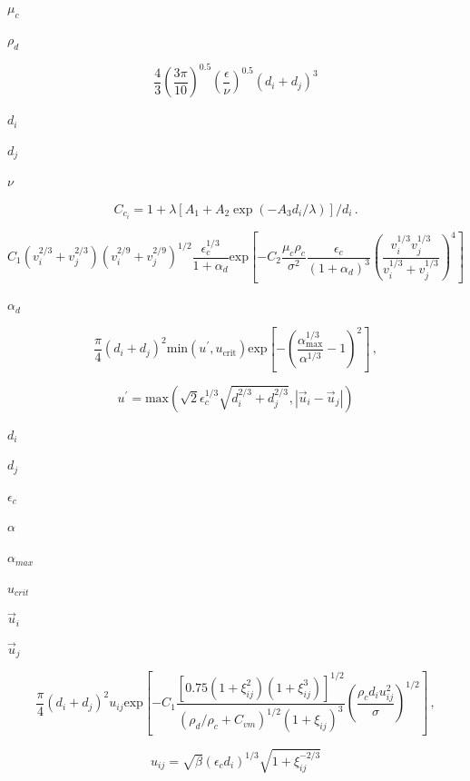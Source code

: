 \documentclass{article}
\begin{document}
$        \mu_c       $
\pagebreak

$        \rho_d      $
\pagebreak

\[
    \frac{4}{3}\left(\frac{3\pi}{10}\right)^{0.5}
    \left(\frac{\epsilon}{\nu}\right)^{0.5}(d_i+d_j)^3
\]
\pagebreak

$        d_i      $
\pagebreak

$        d_j      $
\pagebreak

$        \nu      $
\pagebreak

\[
    C_{c_i} = 1 + \lambda [A_1 + A_2 \exp(-A_3 d_i/\lambda)]/d_i\,.
\]
\pagebreak

\[
    C_1 (v_i^{2/3} + v_j^{2/3}) (v_i^{2/9} + v_j^{2/9})^{1/2}
    \frac{\epsilon_c^{1/3}}{1 + \alpha_d}
    \text{exp}
    \left[
      - C_2 \frac{\mu_c \rho_c}{\sigma^2}
        \frac{\epsilon_c}{(1 + \alpha_d)^{3}}
        \left(
            \frac{v_i^{1/3} v_j^{1/3}}{v_i^{1/3} + v_j^{1/3}}
        \right)^{4}
    \right]
\]
\pagebreak

$        \alpha_d    $
\pagebreak

\[
    \frac{\pi}{4} (d_i + d_j)^2 \mathrm{min}(u^{\prime}, u_{\mathrm{crit}})
    \mathrm{exp}
    \left[
      - \left(\frac{\alpha_{\mathrm{max}}^{1/3}}{\alpha^{1/3}} - 1\right)^2
    \right]\,,
\]
\pagebreak

\[
    u^{\prime}
  =
    \mathrm{max}
    \left(
        \sqrt{2} \epsilon_c^{1/3} \sqrt{d_i^{2/3} + d_j^{2/3}},
        |\vec{u}_i - \vec{u}_j|
    \right)
\]
\pagebreak

$        d_i          $
\pagebreak

$        d_j          $
\pagebreak

$        \epsilon_c   $
\pagebreak

$        \alpha       $
\pagebreak

$        \alpha_{max} $
\pagebreak

$        u_{crit}     $
\pagebreak

$        \vec{u}_i    $
\pagebreak

$        \vec{u}_j    $
\pagebreak

\[
    \frac{\pi}{4} (d_i + d_j)^2 u_{ij}
    \mathrm{exp}
    \left[
      - C_1
        \frac
        {[0.75(1 + \xi_{ij}^2)(1 + \xi_{ij}^3)]^{1/2}}
        {(\rho_d/\rho_c + C_{vm})^{1/2} (1 + \xi_{ij})^3}
        \left(\frac{\rho_c d_i u_{ij}^2}{\sigma}\right)^{1/2}
    \right]\,,
\]
\pagebreak

\[
    u_{ij} = \sqrt{\beta} (\epsilon_c d_i)^{1/3} \sqrt{1 + \xi_{ij}^{-2/3}}
\]
\pagebreak
\end{document}
